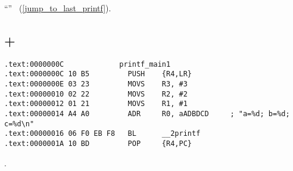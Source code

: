 ``\SwitchCaseDefaultSectionName'' 
~(\ref{jump_to_last_printf}).

\subsection{\OptimizingKeilVI + \ThumbMode}

\begin{lstlisting}[caption=\OptimizingKeilVI + \ThumbMode]
.text:0000000C             printf_main1
.text:0000000C 10 B5         PUSH    {R4,LR}
.text:0000000E 03 23         MOVS    R3, #3
.text:00000010 02 22         MOVS    R2, #2
.text:00000012 01 21         MOVS    R1, #1
.text:00000014 A4 A0         ADR     R0, aADBDCD     ; "a=%d; b=%d; c=%d\n"
.text:00000016 06 F0 EB F8   BL      __2printf
.text:0000001A 10 BD         POP     {R4,PC}
\end{lstlisting}

.


